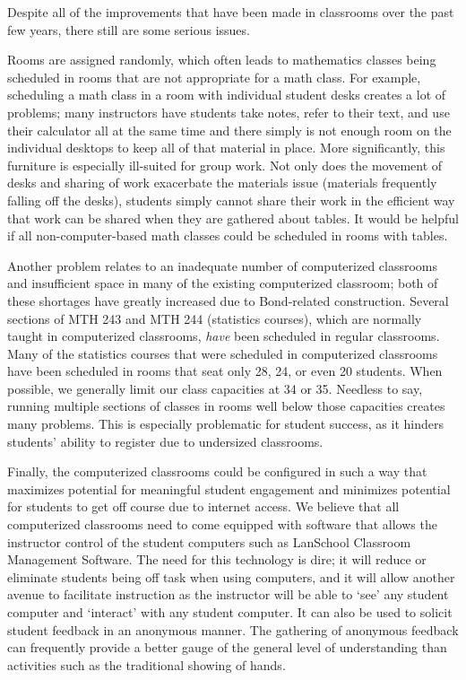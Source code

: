 Despite all of the improvements that have been made in classrooms over the past
few years, there still are some serious issues.

Rooms are assigned randomly, which often leads to mathematics classes being
scheduled in rooms that are not appropriate for a math class. For example,
scheduling a math class in a room with individual student desks creates a lot
of problems; many instructors have students take notes, refer to their text,
and use their calculator all at the same time and there simply is not enough
room on the individual desktops to keep all of that material in place.  More
significantly,  this furniture is especially ill-suited for group work.  Not
only does the movement of desks and sharing of work exacerbate the materials
issue (materials frequently falling off the desks), students simply cannot
share their work in the efficient way that work can be shared when they are
gathered about tables.  It would be helpful if all non-computer-based math
classes could be scheduled in rooms with tables.

Another problem relates to an inadequate number of computerized classrooms and
insufficient space in many of the existing computerized classroom;  both of
these shortages have greatly increased due to Bond-related construction.
Several sections of MTH 243 and MTH 244 (statistics courses), which are
normally taught in computerized classrooms, \emph{have} been scheduled in regular
classrooms.  Many of the statistics courses that were scheduled in
computerized classrooms have been scheduled in rooms that seat only 28, 24, or
even 20 students.  When possible, we generally limit our class capacities at 34
or 35.  Needless to say, running multiple sections of classes in rooms well
below those capacities creates many problems.  This is especially  problematic
for student success, as it hinders students'  ability to register due to
undersized classrooms.

Finally, the computerized classrooms could be configured in such a way that
maximizes potential for meaningful student engagement and minimizes potential
for students to get off course due to internet access.  We believe that all
computerized classrooms need to come equipped with software that allows the
instructor control of the student computers such as LanSchool Classroom
Management Software.   The need for this technology is dire; it will reduce or
eliminate students being off task when using computers, and it will allow
another avenue to facilitate instruction as the instructor will be able to
`see' any student computer and `interact' with any student computer.  It can
also be used to solicit student feedback in an anonymous manner.  The gathering
of anonymous feedback can frequently provide a better gauge of the general
level of understanding than activities such as the traditional showing of
hands.


